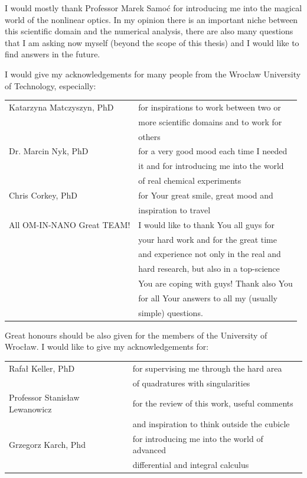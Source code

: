 \documentclass[12pt,twoside,a4paper]{article}
\numberwithin{equation}{subsection}
\numberwithin{figure}{subsection}
\begin{document}
I would mostly thank Professor Marek Samoć for introducing me into the magical world of the nonlinear optics. In my opinion there
is an important niche between this scientific domain and the numerical analysis, there are also many questions that I am asking now
myself (beyond the scope of this thesis) and I would like to find answers in the future.


I would give my acknowledgements for many people from the Wrocław University of Technology, especially:


\begin{tabular}{l l}
	Katarzyna Matczyszyn, PhD  & for inspirations to work between two or \\
	                           & more scientific domains and to work for \\ 
	                           & others \\ 
	Dr. Marcin Nyk, PhD        & for a very good mood each time I needed \\
	                           & it and for introducing me into the world \\
	                           & of real chemical experiments \\
	Chris Corkey, PhD          & for Your great smile, great mood and \\
	                           & inspiration to travel \\
	All OM-IN-NANO Great TEAM! & I would like to thank You all guys for \\ 
	                           & your hard work and for the great time \\
	                           & and experience not only in the real and \\
	                           & hard research, but also in a top-science \\
	                           & You are coping with guys! Thank also You \\
	                           & for all Your answers to all my (usually \\
	                           & simple) questions. \\
\end{tabular}


Great honours should be also given for the members of the University of Wrocław. I would like to give my acknowledgements for:


\begin{tabular}{l l}
    Rafał Keller, PhD              & for supervising me through the hard area \\
                                   & of quadratures with singularities \\ 
    Professor Stanisław Lewanowicz & for the review of this work, useful comments \\
    							   & and inspiration to think outside the cubicle \\
    Grzegorz Karch, Phd            & for introducing me into the world of advanced \\
                                   & differential and integral calculus \\
\end{tabular}
\end{document}
